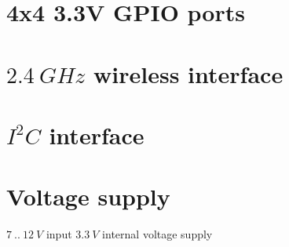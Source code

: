 \section{4x4 3.3V GPIO ports}
\section{$2.4~GHz$ wireless interface}
\section{$I^2C$ interface}
\section{Voltage supply}
$7~..~12~V$ input
$3.3~V$ internal voltage supply

\section{}
\section{}
\section{}
\section{}
